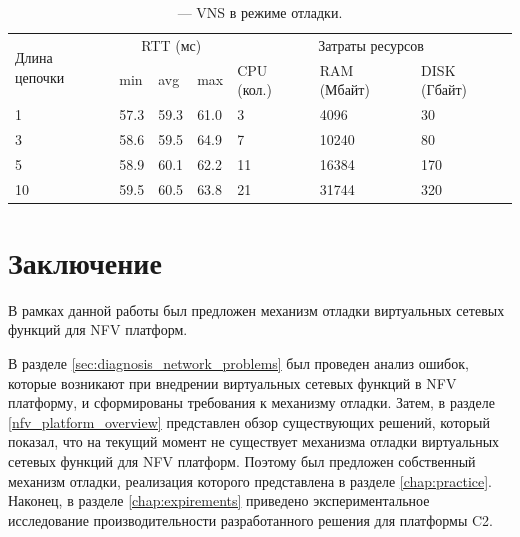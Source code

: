 \documentclass[oneside,final,14pt,a4paper]{extreport}
\begin{document}
\renewcommand{\arraystretch}{1.5}
\begin{table}[h]
\center %
\begin{tabular}{|p{}|p{}|p{}|p{}|p{}|p{}|p{}|} %
\hline %

\multirow{2}{1}{Длина цепочки} & \multicolumn{3}{c|}{RTT (мс)} & \multicolumn{3}{c|}{Затраты ресурсов} \\
\cline{2-7}
& min & avg & max & CPU (кол.) & RAM (Мбайт) & DISK (Гбайт) \\

\hline
1 & 57.3 & 59.3 & 61.0 & 3 & 4096 & 30 \\
\hline
3 & 58.6 & 59.5 & 64.9 & 7 & 10240 & 80 \\
\hline
5 & 58.9 & 60.1 & 62.2 & 11 & 16384 & 170 \\
\hline
10 & 59.5 & 60.5 & 63.8 & 21 & 31744 & 320 \\
\hline
\end{tabular}
\caption{--- VNS в режиме отладки.}
\label{tab:experimental_results}
\end{table}





\chapter*{Заключение}
В рамках данной работы был предложен механизм отладки виртуальных сетевых функций для NFV платформ.

В разделе \ref{sec:diagnosis_network_problems} был проведен анализ ошибок, которые возникают при внедрении виртуальных сетевых функций в NFV платформу, и сформированы требования к механизму отладки. Затем, в разделе \ref{nfv_platform_overview} представлен обзор существующих решений, который показал, что на текущий момент не существует механизма отладки виртуальных сетевых функций для NFV платформ. Поэтому был предложен собственный механизм отладки, реализация которого представлена в разделе \ref{chap:practice}. Наконец, в разделе \ref{chap:expirements} приведено экспериментальное исследование производительности разработанного решения для платформы C2.
\end{document}
